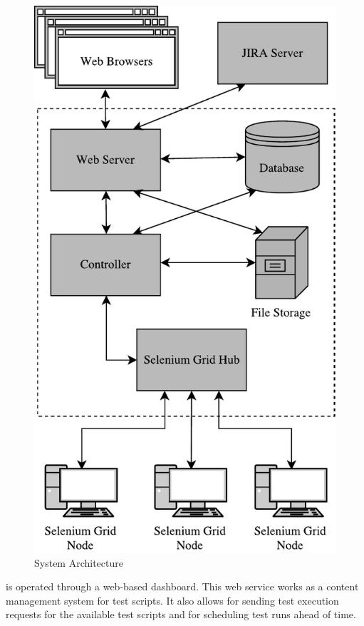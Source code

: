 \begin{figure}[p]
    \centering
    \includegraphics[height=\textheight]{figures/architecture.pdf}
    \caption{System Architecture}
    \label{fig.architecture}
\end{figure}

\toolname \space is operated through a web-based dashboard. This web service works as a content management system for test scripts. It also allows for sending test execution requests for the available test scripts and for scheduling test runs ahead of time. 

